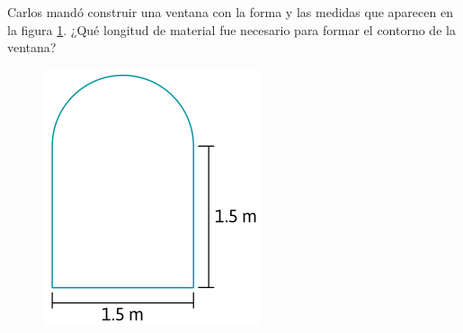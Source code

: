 \question[5] Carlos mandó construir una ventana con la forma y las medidas que aparecen en
la figura \ref{fig:ventana}. ¿Qué longitud de material fue necesario para formar el contorno de la ventana?

\begin{figure}[H]
    \centering
    \includegraphics[width=.5\linewidth]{../images/ventana}
    \label{fig:ventana}
\end{figure}